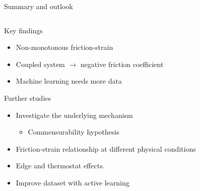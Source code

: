 \documentclass[
	10pt, %
]{beamer}
\begin{document}
\begin{frame}{Summary and outlook}


	\begin{columns} 
		\begin{column}{.5\textwidth}
			Key findings		
			\begin{itemize}
				\item Non-monotonous friction-strain
				\item Coupled system $\to$ negative friction coefficient
				\item Machine learning needs more data
			\end{itemize}
			\vspace*{5mm}
			Further studies
			\begin{itemize}
				\item Investigate the underlying mechanism
				\begin{itemize}
					\item Commensurability hypothesis
				\end{itemize}
				\item Friction-strain relationship at different physical conditions
				\item Edge and thermostat effects.
				\item Improve dataset with active learning 
			\end{itemize}
		\end{column}
		\begin{column}{.5\textwidth}


\end{column}
\end{columns}
\end{frame}
\end{document}

